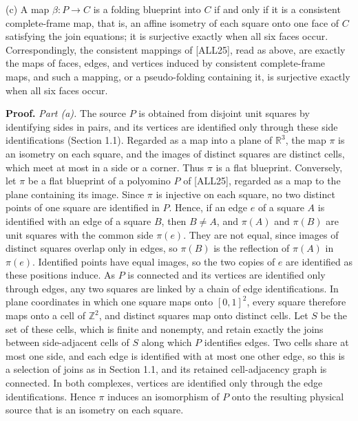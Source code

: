 \documentclass[
  11pt,
]{article}
\newcounter{none} %
\begin{document}
(c) A map \(\beta:P\to C\) is a folding blueprint into \(C\) if and only
if it is a consistent complete-frame map, that is, an affine isometry of
each square onto one face of \(C\) satisfying the join equations; it is
surjective exactly when all six faces occur. Correspondingly, the
consistent mappings of {[}ALL25{]}, read as above, are exactly the maps
of faces, edges, and vertices induced by consistent complete-frame maps,
and such a mapping, or a pseudo-folding containing it, is surjective
exactly when all six faces occur.

\textbf{Proof.} \emph{Part (a).} The source \(P\) is obtained from
disjoint unit squares by identifying sides in pairs, and its vertices
are identified only through these side identifications (Section 1.1).
Regarded as a map into a plane of \(\mathbb R^3\), the map \(\pi\) is an
isometry on each square, and the images of distinct squares are distinct
cells, which meet at most in a side or a corner. Thus \(\pi\) is a flat
blueprint. Conversely, let \(\pi\) be a flat blueprint of a polyomino
\(P\) of {[}ALL25{]}, regarded as a map to the plane containing its
image. Since \(\pi\) is injective on each square, no two distinct points
of one square are identified in \(P\). Hence, if an edge \(e\) of a
square \(A\) is identified with an edge of a square \(B\), then
\(B\neq A\), and \(\pi(A)\) and \(\pi(B)\) are unit squares with the
common side \(\pi(e)\). They are not equal, since images of distinct
squares overlap only in edges, so \(\pi(B)\) is the reflection of
\(\pi(A)\) in \(\pi(e)\). Identified points have equal images, so the
two copies of \(e\) are identified as these positions induce. As \(P\)
is connected and its vertices are identified only through edges, any two
squares are linked by a chain of edge identifications. In plane
coordinates in which one square maps onto \([0,1]^2\), every square
therefore maps onto a cell of \(\mathbb Z^2\), and distinct squares map
onto distinct cells. Let \(S\) be the set of these cells, which is
finite and nonempty, and retain exactly the joins between side-adjacent
cells of \(S\) along which \(P\) identifies edges. Two cells share at
most one side, and each edge is identified with at most one other edge,
so this is a selection of joins as in Section 1.1, and its retained
cell-adjacency graph is connected. In both complexes, vertices are
identified only through the edge identifications. Hence \(\pi\) induces
an isomorphism of \(P\) onto the resulting physical source that is an
isometry on each square.
\end{document}
